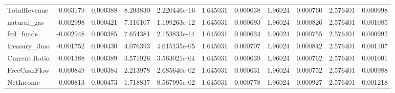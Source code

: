 \documentclass[12pt,a4paper,english]{article}
\begin{document}
{{\begin{tabular}{@{}lrrrrrrrrrr@{}}
			TotalRevenue                  & 0.003179                 & 0.000388                    & 8.203830                  & 2.220446e-16                             & 1.645031                      & 0.000638                      & 1.96024                      & 0.000760                     & 2.576401                     & 0.000998                     \\
			natural\_gas                  & 0.002998                 & 0.000421                    & 7.116107                  & 1.199263e-12                             & 1.645031                      & 0.000693                      & 1.96024                      & 0.000826                     & 2.576401                     & 0.001085                     \\
			fed\_funds                    & -0.002948                & 0.000385                    & 7.654381                  & 2.153833e-14                             & 1.645031                      & 0.000634                      & 1.96024                      & 0.000755                     & 2.576401                     & 0.000992                     \\
			treasury\_3mo                 & -0.001752                & 0.000430                    & 4.076393                  & 4.615135e-05                             & 1.645031                      & 0.000707                      & 1.96024                      & 0.000842                     & 2.576401                     & 0.001107                     \\
			Current Ratio                 & -0.001388                & 0.000389                    & 3.571926                  & 3.563021e-04                             & 1.645031                      & 0.000639                      & 1.96024                      & 0.000762                     & 2.576401                     & 0.001001                     \\
			FreeCashFlow                  & -0.000849                & 0.000384                    & 2.213978                  & 2.685640e-02                             & 1.645031                      & 0.000631                      & 1.96024                      & 0.000752                     & 2.576401                     & 0.000988                     \\
			NetIncome                     & 0.000813                 & 0.000473                    & 1.718837                  & 8.567995e-02                             & 1.645031                      & 0.000778                      & 1.96024                      & 0.000927                     & 2.576401                     & 0.001218                     \\ \bottomrule
		\end{tabular}%
	}
}
\end{document}
